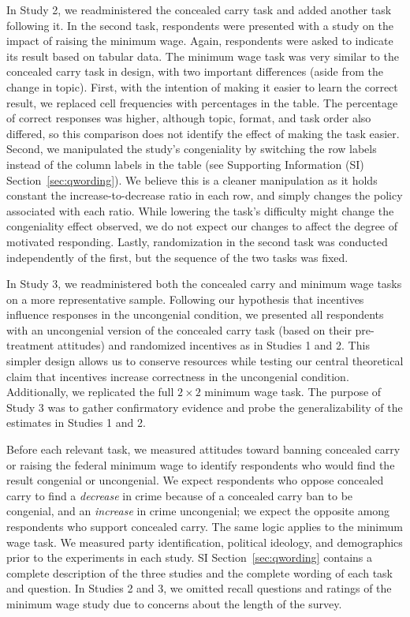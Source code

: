 \documentclass[12pt,letterpaper]{article}
\begin{document}
In Study 2, we readministered the concealed carry task and added another task following it. In the second task, respondents were presented with a study on the impact of raising the minimum wage. Again, respondents were asked to indicate its result based on tabular data. The minimum wage task was very similar to the concealed carry task in design, with two important differences (aside from the change in topic). First, with the intention of making it easier to learn the correct result, we replaced cell frequencies with percentages in the table. The percentage of correct responses was higher, although topic, format, and task order also differed, so this comparison does not identify the effect of making the task easier. Second, we manipulated the study's congeniality by switching the row labels instead of the column labels in the table (see Supporting Information (SI) Section~\ref{sec:qwording}). We believe this is a cleaner manipulation as it holds constant the increase-to-decrease ratio in each row, and simply changes the policy associated with each ratio. While lowering the task's difficulty might change the congeniality effect observed, we do not expect our changes to affect the degree of motivated responding. Lastly, randomization in the second task was conducted independently of the first, but the sequence of the two tasks was fixed.

In Study 3, we readministered both the concealed carry and minimum wage tasks on a more representative sample. Following our hypothesis that incentives influence responses in the uncongenial condition, we presented all respondents with an uncongenial version of the concealed carry task (based on their pre-treatment attitudes) and randomized incentives as in Studies 1 and 2. This simpler design allows us to conserve resources while testing our central theoretical claim that incentives increase correctness in the uncongenial condition. Additionally, we replicated the full $2 \times 2$ minimum wage task. The purpose of Study 3 was to gather confirmatory evidence and probe the generalizability of the estimates in Studies 1 and 2.

Before each relevant task, we measured attitudes toward banning concealed carry or raising the federal minimum wage to identify respondents who would find the result congenial or uncongenial. We expect respondents who oppose concealed carry to find a {\it decrease} in crime because of a concealed carry ban to be congenial, and an {\it increase} in crime uncongenial; we expect the opposite among respondents who support concealed carry. The same logic applies to the minimum wage task. We measured party identification, political ideology, and demographics prior to the experiments in each study. SI Section~\ref{sec:qwording} contains a complete description of the three studies and the complete wording of each task and question. In Studies 2 and 3, we omitted recall questions and ratings of the minimum wage study due to concerns about the length of the survey.
\end{document}
